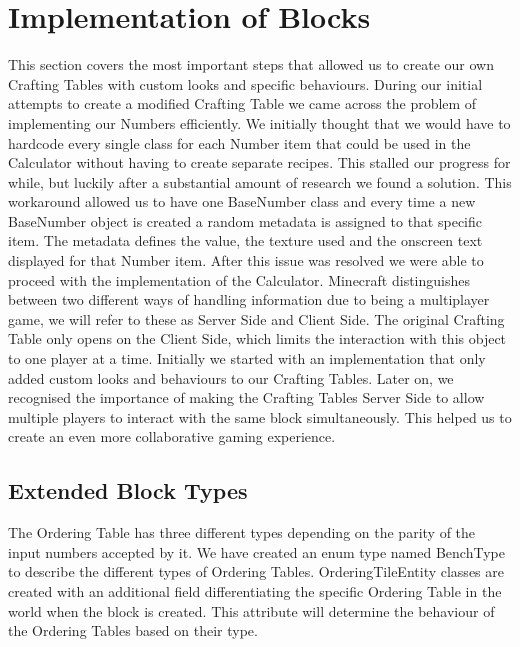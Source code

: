 \section{Implementation of Blocks}
This section covers the most important steps that allowed us to create our own Crafting Tables with custom looks and specific behaviours.\newline\newline
During our initial attempts to create a modified Crafting Table we came across the problem of implementing our Numbers efficiently. We initially thought that we would have to hardcode every single class for each Number item that could be used in the Calculator without having to create separate recipes. This stalled our progress for while, but luckily after a substantial amount of research we found a solution. This workaround allowed us to have one BaseNumber class and every time a new BaseNumber object is created a random metadata is assigned to that specific item. The metadata defines the value, the texture used and the onscreen text displayed for that Number item. After this issue was resolved we were able to proceed with the implementation of the Calculator.\newline\newline
Minecraft distinguishes between two different ways of handling information due to being a multiplayer game, we will refer to these as Server Side and Client Side. The original Crafting Table only opens on the Client Side, which limits the interaction with this object to one player at a time. Initially we started with an implementation that only added custom looks and behaviours to our Crafting Tables. Later on, we recognised the importance of making the Crafting Tables Server Side to allow multiple players to interact with the same block simultaneously. This helped us to create an even more collaborative gaming experience.

\subsection{Extended Block Types}
The Ordering Table has three different types depending on the parity of the input numbers accepted by it. We have created an enum type named BenchType to describe the different types of Ordering Tables. OrderingTileEntity classes are created with an additional field differentiating the specific Ordering Table in the world when the block is created. This attribute will determine the behaviour of the Ordering Tables based on their type.

